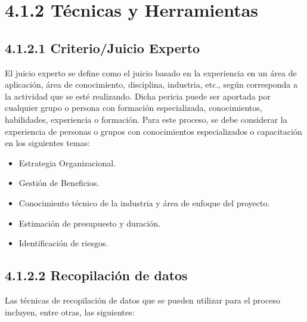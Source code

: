 \documentclass[letterpaper,12pt,openright,oneside]{article}
\theoremstyle{plain}
\begin{document}
\section*{4.1.2 Técnicas y Herramientas}

% 
%
\subsection*{4.1.2.1 Criterio/Juicio Experto}

El juicio experto se define como el juicio basado en la experiencia en un área de aplicación, área de conocimiento, disciplina, industria, etc., según corresponda a la actividad que se esté realizando. Dicha pericia puede ser aportada por cualquier grupo o persona con formación especializada, conocimientos, habilidades, experiencia o formación.
Para este proceso, se debe considerar la experiencia de personas o grupos con conocimientos especializados o capacitación en los siguientes temas:

\begin{itemize}
    \item Estrategia Organizacional.
    \item Gestión de Beneficios.
    \item Conocimiento técnico de la industria y área de enfoque del proyecto.
    \item Estimación de presupuesto y duración.
    \item Identificación de riesgos.
\end{itemize}
% 
% 
\subsection*{4.1.2.2 Recopilación de datos}

Las técnicas de recopilación de datos que se pueden utilizar para el proceso incluyen, entre otras, las siguientes:
\end{document}
